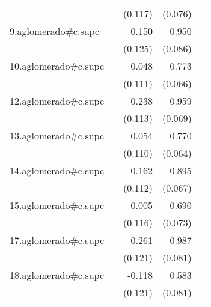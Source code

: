 {\begin{longtable}{l*{4}{D{.}{.}{-1}}}
            &                     &     (0.117)         &     (0.076)         &                     \\
\addlinespace
9.aglomerado#c.supc&                     &       0.150         &       0.950\sym{***}&                     \\
            &                     &     (0.125)         &     (0.086)         &                     \\
\addlinespace
10.aglomerado#c.supc&                     &       0.048         &       0.773\sym{***}&                     \\
            &                     &     (0.111)         &     (0.066)         &                     \\
\addlinespace
12.aglomerado#c.supc&                     &       0.238\sym{*}  &       0.959\sym{***}&                     \\
            &                     &     (0.113)         &     (0.069)         &                     \\
\addlinespace
13.aglomerado#c.supc&                     &       0.054         &       0.770\sym{***}&                     \\
            &                     &     (0.110)         &     (0.064)         &                     \\
\addlinespace
14.aglomerado#c.supc&                     &       0.162         &       0.895\sym{***}&                     \\
            &                     &     (0.112)         &     (0.067)         &                     \\
\addlinespace
15.aglomerado#c.supc&                     &       0.005         &       0.690\sym{***}&                     \\
            &                     &     (0.116)         &     (0.073)         &                     \\
\addlinespace
17.aglomerado#c.supc&                     &       0.261\sym{*}  &       0.987\sym{***}&                     \\
            &                     &     (0.121)         &     (0.081)         &                     \\
\addlinespace
18.aglomerado#c.supc&                     &      -0.118         &       0.583\sym{***}&                     \\
            &                     &     (0.121)         &     (0.081)         &                     \\

\end{longtable}}
